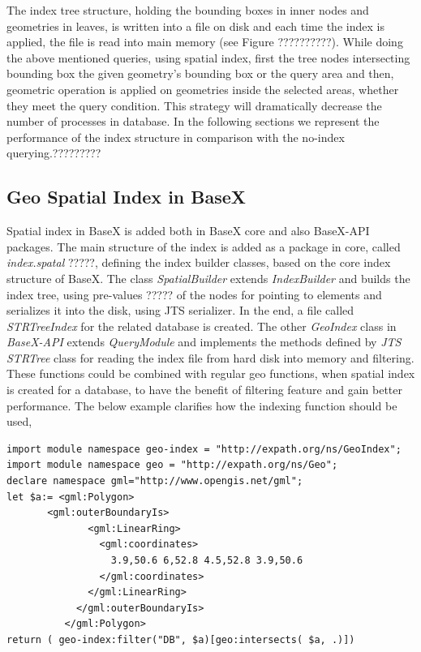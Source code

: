 \documentclass[a4paper,12pt]{article}
\begin{document}
The index tree structure, holding the bounding boxes in inner nodes and geometries in leaves, is written into a file on disk and each time the index is applied, the file is read into main memory (see Figure ??????????). While doing the above mentioned queries, using spatial index, first the tree nodes intersecting bounding box the given geometry's bounding box or the query area and then, geometric operation is applied on geometries inside the selected areas, whether they meet the query condition. This strategy will dramatically decrease the number of processes in database. In the following sections we represent the performance of the index structure in comparison with the no-index querying.?????????

\subsection{Geo Spatial Index in BaseX}
Spatial index in BaseX is added both in BaseX core and also BaseX-API packages. The main structure of the index is added as a package in core, called \textit{index.spatal} ?????, defining the index builder classes, based on the core index structure of BaseX. The class \textit{SpatialBuilder} extends \textit{IndexBuilder} and builds the index tree, using pre-values ????? of the nodes for pointing to elements and serializes it into the disk, using JTS serializer. In the end, a file called \textit{STRTreeIndex} for the related database is created. 
The other \textit{GeoIndex} class in \textit{BaseX-API} extends \textit{QueryModule} and implements the methods defined by \textit{JTS STRTree} class for reading the index file from hard disk into memory and filtering. These functions could be combined with regular geo functions, when spatial index is created for a database, to have the benefit of filtering feature and gain better performance. The below example clarifies how the indexing function should be used,

\begin{verbatim}
import module namespace geo-index = "http://expath.org/ns/GeoIndex";
import module namespace geo = "http://expath.org/ns/Geo";
declare namespace gml="http://www.opengis.net/gml";
let $a:= <gml:Polygon>
	   <gml:outerBoundaryIs>
              <gml:LinearRing>
              	<gml:coordinates>
              	  3.9,50.6 6,52.8 4.5,52.8 3.9,50.6
              	</gml:coordinates>
              </gml:LinearRing>
            </gml:outerBoundaryIs>
          </gml:Polygon>
return ( geo-index:filter("DB", $a)[geo:intersects( $a, .)])
\end{verbatim}
\end{document}
